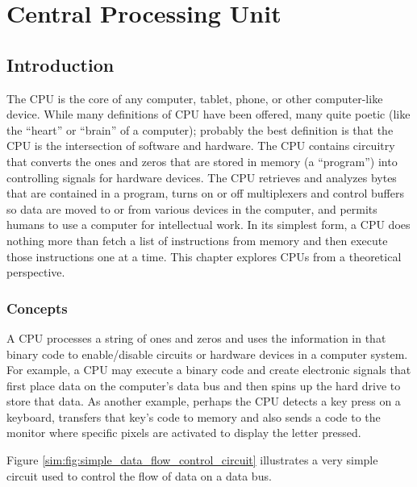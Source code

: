 \section{Central Processing Unit}
\label{SIM:sec:cpu}

\subsection{Introduction}
\label{SIM:subsec:intro_to_cpu}

The \acf{CPU} is the core of any computer, tablet, phone, or other computer-like device. While many definitions of \ac{CPU} have been offered, many quite poetic (like the ``heart'' or ``brain'' of a computer); probably the best definition is that the \ac{CPU} is the intersection of software and hardware. The \ac{CPU} contains circuitry that converts the ones and zeros that are stored in memory (a ``program'') into controlling signals for hardware devices. The \ac{CPU} retrieves and analyzes bytes that are contained in a program, turns on or off multiplexers and control buffers so data are moved to or from various devices in the computer, and permits humans to use a computer for intellectual work. In its simplest form, a \ac{CPU} does nothing more than fetch a list of instructions from memory and then execute those instructions one at a time. This chapter explores \acp{CPU} from a theoretical perspective.

\subsubsection{Concepts}

A \ac{CPU} processes a string of ones and zeros and uses the information in that binary code to enable/disable circuits or hardware devices in a computer system. For example, a \ac{CPU} may execute a binary code and create electronic signals that first place data on the computer's data bus and then spins up the hard drive to store that data. As another example, perhaps the \ac{CPU} detects a key press on a keyboard, transfers that key's code to memory and also sends a code to the monitor where specific pixels are activated to display the letter pressed.

Figure \ref{sim:fig:simple_data_flow_control_circuit} illustrates a very simple circuit used to control the flow of data on a data bus.

